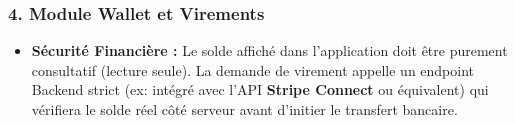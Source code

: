 \subsubsection{4. Module Wallet et Virements}
\begin{itemize}
    \item \textbf{Sécurité Financière :} Le solde affiché dans l'application doit être purement consultatif (lecture seule). La demande de virement appelle un endpoint Backend strict (ex: intégré avec l'API \textbf{Stripe Connect} ou équivalent) qui vérifiera le solde réel côté serveur avant d'initier le transfert bancaire.
\end{itemize}